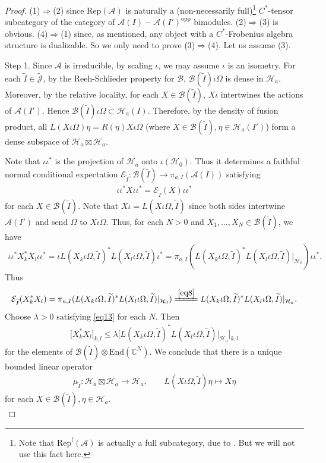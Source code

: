 \documentclass[11pt,b5paper,notitlepage]{article}
\theoremstyle{definition}
\theoremstyle{plain}
\newcommand{\mc}{\mathcal}
\newcommand{\wtd}{\widetilde}
\newcommand{\End}{\mathrm{End}} %
\newcommand{\opp}{\mathrm{opp}}
\newcommand{\Jtd}{\widetilde{\mathcal J}}
\newcommand{\RepA}{\mathrm{Rep}(\mathcal A)}
\newcommand{\RepfA}{\mathrm{Rep}^{\mathrm f}(\mathcal A)}
\newcommand{\Cbb}{\mathbb C}
\numberwithin{equation}{section}
\begin{document}
\begin{proof}
(1)$\Rightarrow$(2) since $\RepA$ is naturally a (non-necessarily full)\footnote{Note that $\RepfA$ is actually a full subcategory, due to \cite[Thm. 2.3]{GL96}. But we will not use this fact here.}  $C^*$-tensor subcategory of the category of $\mc A(I)-\mc A(I')^\opp$ bimodules. (2)$\Rightarrow$(3) is obvious. (4)$\Rightarrow$(1) since, as mentioned, any object with a $C^*$-Frobenius algebra structure is dualizable. So we only need to prove (3)$\Rightarrow$(4). Let us assume (3).

Step 1. Since $\mc A$ is irreducible, by scaling $\iota$, we may assume $\iota$ is an isometry. For each $\wtd I\in\Jtd$, by the Reeh-Schlieder property for $\mc B$,  $\mc B(\wtd I)\iota\Omega$ is dense in $\mc H_a$. Moreover, by the relative locality, for each $X\in\mc B(\wtd I)$,  $X\iota$ intertwines the actions of $\mc A(I')$. Hence $\mc B(\wtd I)\iota\Omega\subset\mc H_a(I)$.   Therefore, by the density of fusion product, all $L(X\iota\Omega)\eta=R(\eta)X\iota\Omega$ (where $X\in\mc B(\wtd I),\eta\in\mc H_a(I')$) form a dense subspace of $\mc H_a\boxtimes\mc H_a$. 

Note that $\iota\iota^*$ is the projection of $\mc H_a$ onto $\iota(\mc H_0)$. Thus it determines a faithful normal conditional expectation $\mc E_{\wtd I}:\mc B(\wtd I)\rightarrow\pi_{a,I}(\mc A(I))$ satisfying 
\begin{align*}
\iota\iota^* X\iota\iota^*=\mc E_{\wtd I}(X)\iota\iota^*	
\end{align*}
for each $X\in\mc B(\wtd I)$. Note that $X\iota=L(X\iota\Omega,\wtd I)$ since both sides intertwine $\mc A(I')$ and send $\Omega$ to $X\iota\Omega$. Thus, for each $N>0$ and $X_1,\dots,X_N\in\mc B(\wtd I)$, we have
\begin{align*}
\iota\iota^* X_k^*X_l\iota\iota^*=\iota L(X_k\iota\Omega,\wtd I)^* L(X_l\iota\Omega,\wtd I)\iota^*=\pi_{a,I}(L(X_k\iota\Omega,\wtd I)^* L(X_l\iota\Omega,\wtd I)|_{\mc H_0})\iota\iota^*.
\end{align*}
Thus
\begin{align}
\mc E_{\wtd I}(X_k^*X_l)=\pi_{a,I}(L(X_k\iota\Omega,\wtd I)^* L(X_l\iota\Omega,\wtd I)|_{\mc H_0})\xlongequal{\eqref{eq8}}L(X_k\iota\Omega,\wtd I)^* L(X_l\iota\Omega,\wtd I)|_{\mc H_a}.	
\end{align}
Choose $\lambda>0$ satisfying \eqref{eq13} for each $N$. Then
\begin{align}
\big[X_k^*X_l\big]_{k,l}\leq \lambda \big[L(X_k\iota\Omega,\wtd I)^* L(X_l\iota\Omega,\wtd I)\big|_{\mc H_a}\big]_{k,l}	
\end{align}
for the elements of $\mc B(\wtd I)\otimes\End(\Cbb^N)$. We conclude that there is a unique bounded linear operator 
\begin{align}
\mu_{\wtd I}:\mc H_a\boxtimes\mc H_a\rightarrow\mc H_a,\qquad 	L(X\iota\Omega,\wtd I)\eta\mapsto X\eta\label{eq15}
\end{align}
for each $X\in\mc B(\wtd I),\eta\in\mc H_a$. \\


\end{proof}
\end{document}
